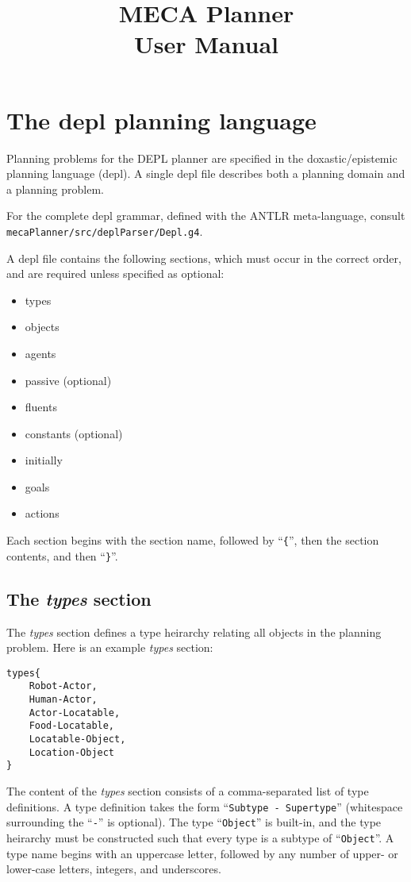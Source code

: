 \documentclass{article}
\title{MECA Planner  \\
\large User Manual
}
\begin{document}
\maketitle

\section{The depl planning language}

Planning problems for the DEPL planner are specified in the doxastic/epistemic
planning language (depl). A single depl file describes both a planning domain
and a planning problem.

For the complete depl grammar, defined with the ANTLR meta-language, consult
\texttt{mecaPlanner/src/deplParser/Depl.g4}.


A depl file contains the following sections, which must occur in the correct
order, and are required unless specified as optional:

\begin{itemize}
\item types
\item objects
\item agents
\item passive (optional)
\item fluents
\item constants (optional)
\item initially
\item goals
\item actions
\end{itemize}

\noindent
Each section begins with the section name, followed by
``\verb|{|'', 
then the section contents, and then
``\verb|}|''. 


\subsection{The \emph{types} section}

The \emph{types} section defines a type heirarchy relating all objects in the planning
problem.
Here is an example \emph{types} section:
\begin{verbatim}
types{
    Robot-Actor,
    Human-Actor,
    Actor-Locatable,
    Food-Locatable,
    Locatable-Object,
    Location-Object
}
\end{verbatim}

The content of the \emph{types} section consists of a comma-separated list of
type definitions. A type definition takes the form
``\texttt{Subtype - Supertype}'' (whitespace surrounding the ``\texttt{-}'' is
optional). The type ``\texttt{Object}'' is built-in, and
the type heirarchy must be constructed such that every type is a subtype of
``\texttt{Object}''.  A type name begins with an uppercase letter, followed
by any number of upper- or lower-case letters, integers, and underscores.
\end{document}
